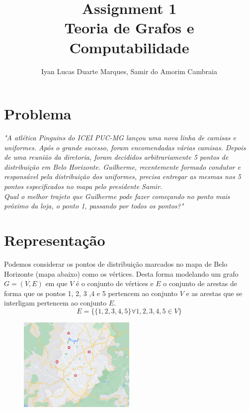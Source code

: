 \documentclass[12pt]{article}
\title{Assignment 1 \\ Teoria de Grafos e Computabilidade}
\author{Iyan Lucas Duarte Marques\inst{1}, Samir do Amorim Cambraia\inst{1}}
\begin{document}
\maketitle

\section{Problema}
\textit{"A atlética Pinguins do ICEI PUC-MG lançou uma nova linha de camisas e uniformes.
Após o grande sucesso,  foram encomendadas várias camisas.
Depois de uma reunião da diretoria, foram decididos arbitrariamente 5 pontos de distribuição em Belo Horizonte.
Guilherme, recentemente formado condutor e responsável pela distribuição dos uniformes, precisa entregar as mesmas nos 5 pontos especificados no mapa pelo presidente Samir.\\
Qual o melhor trajeto que Guilherme pode fazer começando no ponto mais próximo da loja, o ponto 1, passando por todos os pontos?"}

\section{Representação}
Podemos considerar os pontos de distribuição marcados no mapa de Belo Horizonte (mapa abaixo) como os vértices.
Desta forma modelando um grafo $G = (V, E)$ em que $V$ é o conjunto de vértices e $E$ o conjunto de arestas
de forma que os pontos 1, 2, 3 ,4 e 5 pertencem ao conjunto $V$ e as arestas que se interligam pertencem ao conjunto $E$.
\begin{equation}
    E = \{\{1, 2, 3, 4, 5\} \forall 1, 2, 3, 4, 5 \in V\}
\end{equation}

\begin{center}
    \begin{figure}[h!]
        \centering
        \includegraphics[width=0.5\textwidth]{imagens/grafos1.jpeg}
    \end{figure}
\end{center}
\end{document}
